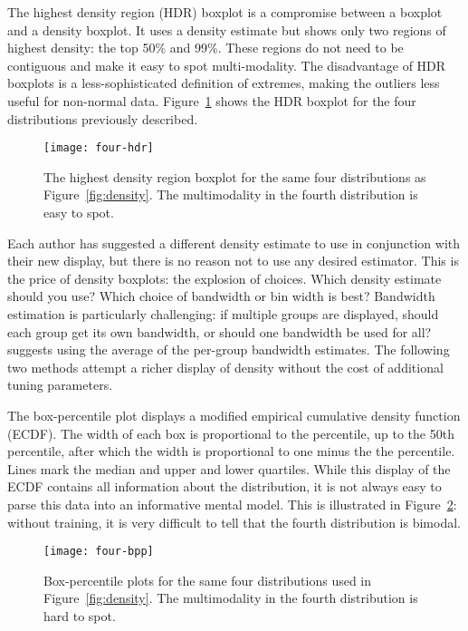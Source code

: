 \documentclass[oneside]{article}
\begin{document}
The highest density region (HDR) boxplot \citep{hyndman:1996a} is a compromise between a boxplot and a density boxplot. It uses a density estimate but shows only two regions of highest density: the top 50\% and 99\%. These regions do not need to be contiguous and make it easy to spot multi-modality. The disadvantage of HDR boxplots is a less-sophisticated definition of extremes, making the outliers less useful for non-normal data. Figure~\ref{fig:hdr} shows the HDR boxplot for the four distributions previously described.

\begin{figure}[htbp]
  \centering
    \texttt{[image: four-hdr]}%
  \caption{The highest density region boxplot for the same four distributions as Figure~\ref{fig:density}. The multimodality in the fourth distribution is easy to spot.}
  \label{fig:hdr}
\end{figure}

Each author has suggested a different density estimate to use in conjunction with their new display, but there is no reason not to use any desired estimator. This is the price of density boxplots: the explosion of choices. Which density estimate should you use? Which choice of bandwidth or bin width is best? Bandwidth estimation is particularly challenging: if multiple groups are displayed, should each group get its own bandwidth, or should one bandwidth be used for all? \citet{kampstra:2008} suggests using the average of the per-group bandwidth estimates. The following two methods attempt a richer display of density without the cost of additional tuning parameters.

The box-percentile plot \citep{esty:2003} displays a modified empirical cumulative density function (ECDF). The width of each box is proportional to the percentile, up to the 50th percentile, after which the width is proportional to one minus the the percentile. Lines mark the median and upper and lower quartiles. While this display of the ECDF contains all information about the distribution, it is not always easy to parse this data into an informative mental model. This is illustrated in Figure~\ref{fig:bpp}: without training, it is very difficult to tell that the fourth distribution is bimodal.

\begin{figure}[htbp]
  \centering
  \texttt{[image: four-bpp]}
  \caption{Box-percentile plots for the same four distributions used in Figure~\ref{fig:density}. The multimodality in the fourth distribution is hard to spot.}
  \label{fig:bpp}
\end{figure}
\end{document}
